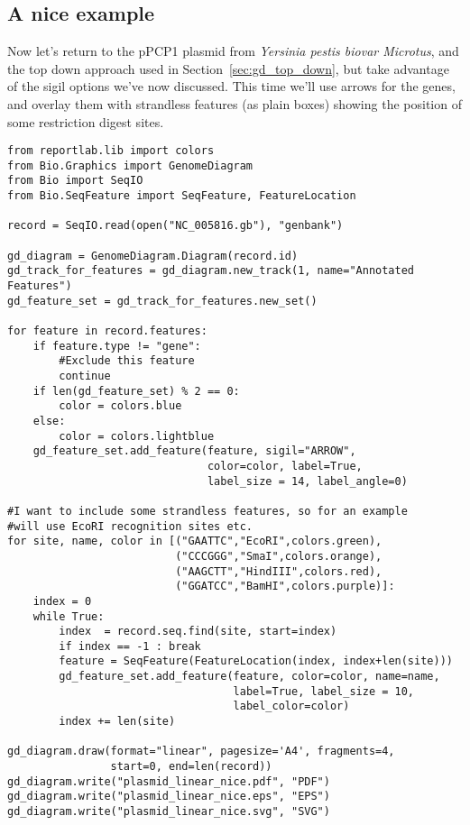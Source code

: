 \documentclass{report}
\begin{document}
\subsection{A nice example}
\label{sec:gd_nice_example}

Now let's return to the pPCP1 plasmid from \textit{Yersinia pestis biovar
Microtus}, and the top down approach used in Section~\ref{sec:gd_top_down},
but take advantage of the sigil options we've now discussed.  This time
we'll use arrows for the genes, and overlay them with strandless features
(as plain boxes) showing the position of some restriction digest sites.

\begin{verbatim}
from reportlab.lib import colors
from Bio.Graphics import GenomeDiagram
from Bio import SeqIO
from Bio.SeqFeature import SeqFeature, FeatureLocation

record = SeqIO.read(open("NC_005816.gb"), "genbank")

gd_diagram = GenomeDiagram.Diagram(record.id)
gd_track_for_features = gd_diagram.new_track(1, name="Annotated Features")
gd_feature_set = gd_track_for_features.new_set()

for feature in record.features:
    if feature.type != "gene":
        #Exclude this feature
        continue
    if len(gd_feature_set) % 2 == 0:
        color = colors.blue
    else:
        color = colors.lightblue
    gd_feature_set.add_feature(feature, sigil="ARROW",
                               color=color, label=True,
                               label_size = 14, label_angle=0)

#I want to include some strandless features, so for an example
#will use EcoRI recognition sites etc.
for site, name, color in [("GAATTC","EcoRI",colors.green),
                          ("CCCGGG","SmaI",colors.orange),
                          ("AAGCTT","HindIII",colors.red),
                          ("GGATCC","BamHI",colors.purple)]:
    index = 0
    while True:
        index  = record.seq.find(site, start=index)
        if index == -1 : break
        feature = SeqFeature(FeatureLocation(index, index+len(site)))
        gd_feature_set.add_feature(feature, color=color, name=name,
                                   label=True, label_size = 10,
                                   label_color=color)
        index += len(site)

gd_diagram.draw(format="linear", pagesize='A4', fragments=4,
                start=0, end=len(record))
gd_diagram.write("plasmid_linear_nice.pdf", "PDF")
gd_diagram.write("plasmid_linear_nice.eps", "EPS")
gd_diagram.write("plasmid_linear_nice.svg", "SVG")
\end{verbatim}
\end{document}
